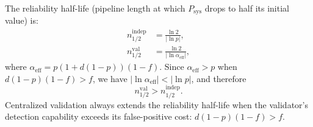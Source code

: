 \begin{corollary}
\label{cor:halflife-comparison}
The reliability half-life (pipeline length at which $P_{\mathrm{sys}}$ drops to half its
initial value) is:
\begin{align*}
  n_{1/2}^{\mathrm{indep}} &= \frac{\ln 2}{|\ln p|}, \\
  n_{1/2}^{\mathrm{val}} &= \frac{\ln 2}{|\ln \alpha_{\mathrm{eff}}|},
\end{align*}
where $\alpha_{\mathrm{eff}} = p(1+d(1-p))(1-f)$. Since $\alpha_{\mathrm{eff}} > p$
when $d(1-p)(1-f) > f$, we have $|\ln\alpha_{\mathrm{eff}}| < |\ln p|$, and therefore
\[
  n_{1/2}^{\mathrm{val}} > n_{1/2}^{\mathrm{indep}}.
\]
Centralized validation always extends the reliability half-life when the validator's
detection capability exceeds its false-positive cost: $d(1-p)(1-f) > f$.
\end{corollary}

